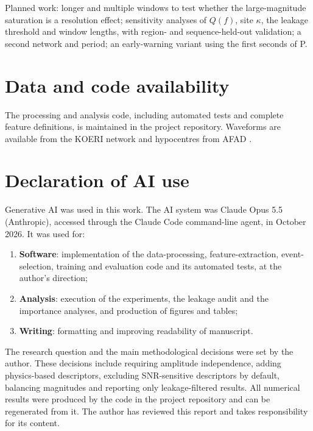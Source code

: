 \documentclass[11pt,a4paper]{article}
\begin{document}
Planned work: longer and multiple windows to test whether the large-magnitude
saturation is a resolution effect; sensitivity analyses of $Q(f)$, site
$\kappa$, the leakage threshold and window lengths, with region- and
sequence-held-out validation; a second network and period; an early-warning
variant using the first seconds of P.

\section*{Data and code availability}
The processing and analysis code, including automated tests and complete
feature definitions, is maintained in the project repository. Waveforms are
available from the KOERI network  and hypocentres from AFAD
.

\section{Declaration of AI use}
\label{sec:ai}

Generative AI was used in this work. The AI system was Claude Opus 5.5 (Anthropic),
accessed through the Claude Code command-line agent, in October 2026. It was used for:
\begin{enumerate}
  \item \textbf{Software}: implementation of the data-processing,
    feature-extraction, event-selection, training and evaluation code and its
    automated tests, at the author's direction;
  \item \textbf{Analysis}: execution of the experiments, the leakage audit and
    the importance analyses, and production of figures and tables;
  \item \textbf{Writing}: formatting and improving readability of manuscript.
\end{enumerate}
The research question and the main methodological decisions were set by the
author. These decisions include requiring amplitude independence, adding
physics-based descriptors, excluding SNR-sensitive descriptors by default,
balancing magnitudes and reporting only leakage-filtered results.
All numerical results were produced by the code in the project
repository and can be regenerated from it. The author has reviewed this
report and takes responsibility for its content.

\renewcommand{\bibfont}{\small}  %
\setlength{\bibsep}{2pt}


\end{document}
